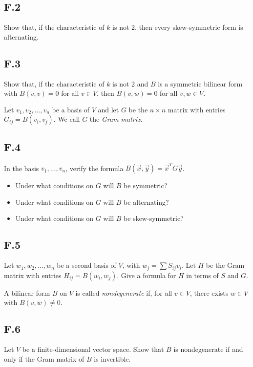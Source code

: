 \documentclass[lang=cn,11pt]{template}
\begin{document}
\subsection*{F.2} Show that, if the characteristic of \( k \) is not 2, then every skew-symmetric form is alternating.

\subsection*{F.3} Show that, if the characteristic of \( k \) is not 2 and \( B \) is a symmetric bilinear form with \( B(v, v) = 0 \) for all \( v \in V \), then \( B(v, w) = 0 \) for all \( v, w \in V \).

Let \( v_1, v_2, \dots, v_n \) be a basis of \( V \) and let \( G \) be the \( n \times n \) matrix with entries \( G_{ij} = B(v_i, v_j) \). We call \( G \) the \textit{Gram matrix}.

\subsection*{F.4} In the basis \( v_1, \dots, v_n \), verify the formula \( B(\vec{x}, \vec{y}) = \vec{x}^T G \vec{y} \). 
\begin{itemize}
    \item Under what conditions on \( G \) will \( B \) be symmetric?
    \item Under what conditions on \( G \) will \( B \) be alternating?
    \item Under what conditions on \( G \) will \( B \) be skew-symmetric?
\end{itemize}

\subsection*{F.5} Let \( w_1, w_2, \dots, w_n \) be a second basis of \( V \), with \( w_j = \sum S_{ij} v_i \). Let \( H \) be the Gram matrix with entries \( H_{ij} = B(w_i, w_j) \). Give a formula for \( H \) in terms of \( S \) and \( G \).

\begin{definition}
A bilinear form \( B \) on \( V \) is called \textit{nondegenerate} if, for all \( v \in V \), there exists \( w \in V \) with \( B(v, w) \neq 0 \).
\end{definition}

\subsection*{F.6} Let \( V \) be a finite-dimensional vector space. Show that \( B \) is nondegenerate if and only if the Gram matrix of \( B \) is invertible.
\end{document}

